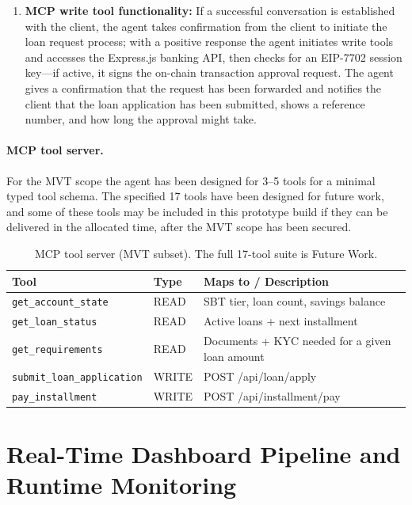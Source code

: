\documentclass[12pt,a4paper]{report}
\newcommand{\tableheadcolor}{\rowcolor{TableHeadBg}}
\begin{document}
\begin{enumerate}[noitemsep]
\item \textbf{MCP write tool functionality:} If a successful conversation is established with the client, the agent takes confirmation from the client to initiate the loan request process; with a positive response the agent initiates write tools and accesses the Express.js banking API, then checks for an EIP-7702 session key---if active, it signs the on-chain transaction approval request. The agent gives a confirmation that the request has been forwarded and notifies the client that the loan application has been submitted, shows a reference number, and how long the approval might take.
\end{enumerate}

\paragraph{MCP tool server.} For the MVT scope the agent has been designed for 3--5 tools for a minimal typed tool schema. The specified 17 tools have been designed for future work, and some of these tools may be included in this prototype build if they can be delivered in the allocated time, after the MVT scope has been secured.

\begin{table}[H]
\centering
\caption[MCP tool server (MVT subset)]{MCP tool server (MVT subset). The full 17-tool suite is Future Work.}
\label{tab:mcp-tools}
\begin{tabular}{p{4.8cm}p{1.4cm}p{6.3cm}}
\toprule
\tableheadcolor
\textbf{Tool} & \textbf{Type} & \textbf{Maps to / Description} \\
\midrule
\texttt{get\_account\_state}       & READ & SBT tier, loan count, savings balance \\
\texttt{get\_loan\_status}         & READ & Active loans + next installment \\
\texttt{get\_requirements}         & READ & Documents + KYC needed for a given loan amount \\
\texttt{submit\_loan\_application} & WRITE & POST /api/loan/apply \\
\texttt{pay\_installment}          & WRITE & POST /api/installment/pay \\
\bottomrule
\end{tabular}
\end{table}

\section{Real-Time Dashboard Pipeline and Runtime Monitoring}
\label{sec:realtime}
\end{document}
